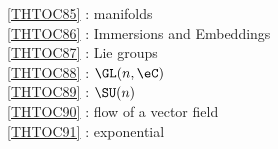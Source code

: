 \ref {THTOC85} : manifolds\\
\ref {THTOC86} : Immersions and Embeddings\\
\ref {THTOC87} : Lie groups\\
\ref {THTOC88} : \( \GL (n,\eC )\)\\
\ref {THTOC89} : \( \SU (n)\)\\
\ref {THTOC90} : flow of a vector field\\
\ref {THTOC91} : exponential\\
